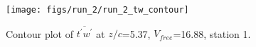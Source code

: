 \begin{figure}[H]
\centering
\texttt{[image: figs/run\_2/run\_2\_tw\_contour]}
\caption{Contour plot of $\overline{t^\prime w^\prime}$ at $z/c$=5.37, $V_{free}$=16.88, station 1.}
\label{fig:run_2_tw_contour}
\end{figure}


